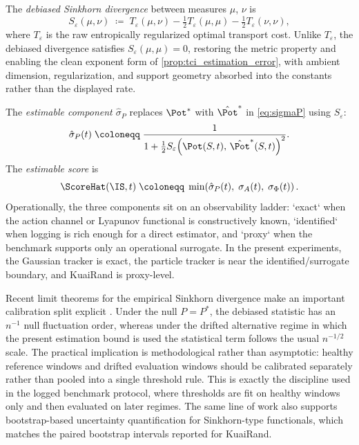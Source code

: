 \begin{definition}\label{def:tci_estimable}
The \emph{debiased Sinkhorn divergence} between measures $\mu$, $\nu$ is
\[
  S_\varepsilon(\mu,\nu)
  \;\coloneqq\;
  T_\varepsilon(\mu,\nu)
  - \tfrac{1}{2}T_\varepsilon(\mu,\mu)
  - \tfrac{1}{2}T_\varepsilon(\nu,\nu),
\]
where $T_\varepsilon$ is the raw entropically regularized optimal transport cost.
Unlike $T_\varepsilon$, the debiased divergence satisfies $S_\varepsilon(\mu,\mu) = 0$,
restoring the metric property and enabling the clean exponent form of
\cref{prop:tci_estimation_error}, with ambient dimension, regularization, and
support geometry absorbed into the constants rather than the displayed rate.

The \emph{estimable component $\hat\sigma_P$} replaces $\Pot^*$ with
$\hat\Pot^*$ in \cref{eq:sigmaP} using $S_\varepsilon$:
\[
  \hat\sigma_P(t) \;\coloneqq\;
  \frac{1}{1 + \tfrac{1}{2}
    S_\varepsilon\!\left(\Pot(S,t),\,\hat{\Pot}^*(S,t)\right)^2}.
\]
The \emph{estimable score} is
\[
  \ScoreHat(\IS,t) \;\coloneqq\;
  \min\!\left(\hat\sigma_P(t),\;\sigma_A(t),\;\sigma_\Phi(t)\right).
\]
Operationally, the three components sit on an observability ladder: `exact`
when the action channel or Lyapunov functional is constructively known,
`identified` when logging is rich enough for a direct estimator, and `proxy`
when the benchmark supports only an operational surrogate. In the present
experiments, the Gaussian tracker is exact, the particle tracker is near the
identified/surrogate boundary, and KuaiRand is proxy-level.
\end{definition}

\begin{remark}
Recent limit theorems for the empirical Sinkhorn divergence make an important
calibration split explicit \citep{GoldfeldEtAl2022}. Under the null $P = P^*$,
the debiased statistic has an $n^{-1}$ null fluctuation order, whereas under the
drifted alternative regime in which the present estimation bound is used the
statistical term follows the usual $n^{-1/2}$ scale. The practical implication
is methodological rather than asymptotic: healthy reference windows and drifted
evaluation windows should be calibrated separately rather than pooled into a
single threshold rule. This is exactly the discipline used in the logged
benchmark protocol, where thresholds are fit on healthy windows only and then
evaluated on later regimes. The same line of work also supports
bootstrap-based uncertainty quantification for Sinkhorn-type functionals, which
matches the paired bootstrap intervals reported for KuaiRand.
\end{remark}

